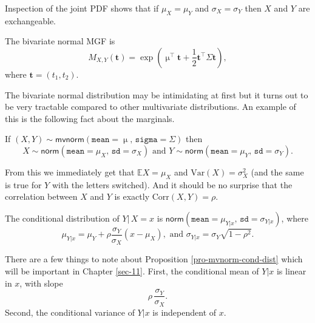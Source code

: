 \begin{rem}
Inspection of the joint PDF shows that if \(\mu_{X}=\mu_{Y}\) and
\(\sigma_{X}=\sigma_{Y}\) then \(X\) and \(Y\) are exchangeable.
\end{rem}

The bivariate normal MGF is
\begin{equation}
M_{X,Y}(\mathbf{t})=\exp\left(\upmu^{\top}\mathbf{t}+\frac{1}{2}\mathbf{t}^{\top}\Sigma\mathbf{t}\right),
\end{equation}
where \(\mathbf{t}=(t_{1},t_{2})\).

The bivariate normal distribution may be intimidating at first but it
turns out to be very tractable compared to other multivariate
distributions. An example of this is the following fact about the
marginals.

\begin{fact}
If \((X,Y)\sim\mathsf{mvnorm}(\mathtt{mean}=\upmu,\,\mathtt{sigma}=\Sigma)\) then
\begin{equation}
X\sim\mathsf{norm}(\mathtt{mean}=\mu_{X},\,\mathtt{sd}=\sigma_{X})\mbox{ and }Y\sim\mathsf{norm}(\mathtt{mean}=\mu_{Y},\,\mathtt{sd}=\sigma_{Y}).
\end{equation}
\end{fact}

From this we immediately get that \(\mathbb{E} X=\mu_{X}\) and
\(\mbox{Var}(X)=\sigma_{X}^{2}\) (and the same is true for \(Y\) with
the letters switched). And it should be no surprise that the
correlation between \(X\) and \(Y\) is exactly
\(\mbox{Corr}(X,Y)=\rho\).

\begin{prop}
\label{pro-mvnorm-cond-dist} The conditional distribution of \(Y|\, X=x\)
is \(\mathsf{norm}(\mathtt{mean} = \mu_{Y|x}, \, \mathtt{sd} =
\sigma_{Y|x})\), where
\begin{equation}
\mu_{Y|x}=\mu_{Y}+\rho\frac{\sigma_{Y}}{\sigma_{X}}\left(x-\mu_{X}\right),\mbox{ and }\sigma_{Y|x}=\sigma_{Y}\sqrt{1-\rho^{2}}.
\end{equation}
\end{prop}

There are a few things to note about Proposition \ref{pro-mvnorm-cond-dist}
which will be important in Chapter \ref{sec-11}. First,
the conditional mean of \(Y|x\) is linear in \(x\), with slope
\begin{equation}
\label{eq-population-slope-slr}
\rho\,\frac{\sigma_{Y}}{\sigma_{X}}.
\end{equation}
Second, the conditional variance of \(Y|x\) is independent of \(x\). 

